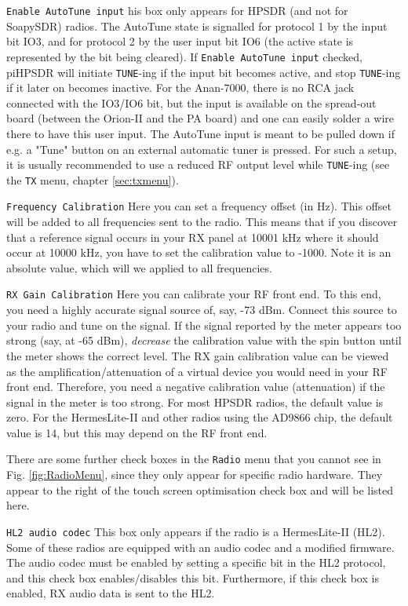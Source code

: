 \documentclass[12pt]{book}
\def\rett#1{\texttt{\color{red}#1}}
\def\bltt#1{\texttt{\color{blue}#1}}
\def\pH{pi\-HPSDR\xspace}
\begin{document}
\rett{Enable AutoTune  input} his box only appears for HPSDR (and not for SoapySDR)
radios. The AutoTune state is signalled for protocol 1 by the input bit IO3,
and for protocol 2 by the user input bit IO6 (the active state is represented
by the bit being cleared).
If \rett{Enable AutoTune  input} checked, \pH will initiate \bltt{TUNE}-ing if the
input bit becomes active, and stop \bltt{TUNE}-ing if it later on becomes inactive.
For the Anan-7000, there is no RCA jack connected with the IO3/IO6 bit, but the
input is available on the spread-out board (between the Orion-II and the PA board) and one
can easily solder a wire there to have this user input. The AutoTune input is meant to
be pulled down if e.g. a "Tune" button on an external automatic tuner is pressed.
For such a setup, it is usually recommended to use a reduced RF output level while
\bltt{TUNE}-ing  (see the \bltt{TX} menu, chapter \ref{sec:txmenu}).


\rett{Frequency Calibration} Here you can set a frequency offset (in Hz). This offset
will be added to all frequencies sent to the radio. This means that if you discover that
a reference signal occurs in your RX panel at 10001 kHz where it should occur at 10000
kHz, you have to set the calibration value to -1000. Note it is an absolute value,
which will we applied to all frequencies.

\rett{RX Gain Calibration} Here you can calibrate your RF front end. To this end, you
need a highly accurate signal source of, say, -73 dBm. Connect this source to your
radio and tune on the signal. If the signal reported by the meter
appears too strong (say, at -65 dBm),
\textit{decrease} the
calibration value with the spin button until the meter shows the correct level.
The RX gain calibration value can be viewed as the  amplification/attenuation of
a virtual device you
would need in your RF front end. Therefore, you need a negative calibration value (attenuation)
if the signal in the meter is too strong. For most HPSDR radios, the default value is
zero. For the HermesLite-II and other radios using the AD9866 chip, the default
value is 14, but this may depend on the RF front end.

There are some further check boxes in the \bltt{Radio} menu that you cannot see
in Fig. \ref{fig:RadioMenu}, since they only appear for specific radio hardware.
They appear to the right of the touch screen optimisation check box
and will be listed here.

\rett{HL2 audio codec} This box only appears if the radio is a HermesLite-II (HL2). Some
of these radios are equipped with an audio codec and a modified firmware. The
audio codec must be enabled by setting a specific bit in the HL2 protocol,
and this check box enables/disables this bit. Furthermore, if this check box
is enabled, RX audio data is sent to the HL2.
\end{document}
